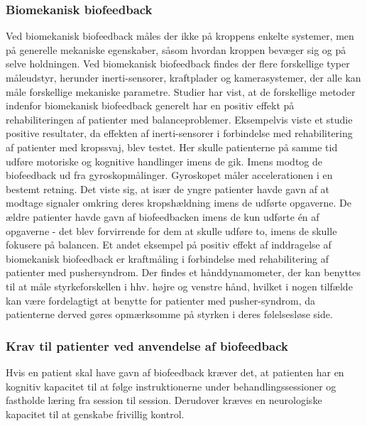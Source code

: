 \subsubsection{Biomekanisk biofeedback}
Ved biomekanisk biofeedback måles der ikke på kroppens enkelte systemer, men på generelle mekaniske egenskaber, såsom hvordan kroppen bevæger sig og på selve holdningen.  
Ved biomekanisk biofeedback findes der flere forskellige typer måleudstyr, herunder inerti-sensorer, kraftplader og kamerasystemer, der alle kan måle forskellige mekaniske parametre. Studier har vist, at de forskellige metoder indenfor biomekanisk biofeedback generelt har en positiv effekt på rehabiliteringen af patienter med balanceproblemer. Eksempelvis viste et studie positive resultater, da effekten af inerti-sensorer i forbindelse med rehabilitering af patienter med kropssvaj, blev testet. Her skulle patienterne på samme tid udføre motoriske og kognitive handlinger imens de gik. Imens modtog de biofeedback ud fra gyroskopmålinger.\cite{Giggins2013} Gyroskopet måler accelerationen i en bestemt retning\cite{Hjaelpemiddelbasen}. Det viste sig, at især de yngre patienter havde gavn af at modtage signaler omkring deres kropshældning imens de udførte opgaverne. De ældre patienter havde gavn af biofeedbacken imens de kun udførte én af opgaverne - det blev forvirrende for dem at skulle udføre to, imens de skulle fokusere på balancen.\cite{Giggins2013} 
Et andet eksempel på positiv effekt af inddragelse af biomekanisk biofeedback er kraftmåling i forbindelse med rehabilitering af patienter med pushersyndrom.
Der findes et hånddynamometer, der kan benyttes til at måle styrkeforskellen i hhv. højre og venstre hånd, hvilket i nogen tilfælde kan være fordelagtigt at benytte for patienter med pusher-syndrom, da patienterne derved gøres opmærksomme på styrken i deres følelsesløse side.\cite{Hjaelpemiddelbasen}

\subsubsection{Krav til patienter ved anvendelse af biofeedback}
Hvis en patient skal have gavn af biofeedback kræver det, at patienten har en kognitiv kapacitet til at følge instruktionerne under behandlingssessioner og fastholde læring fra session til session. Derudover kræves en neurologiske kapacitet til at genskabe frivillig kontrol. \cite{Middaugh1989} \\


 



